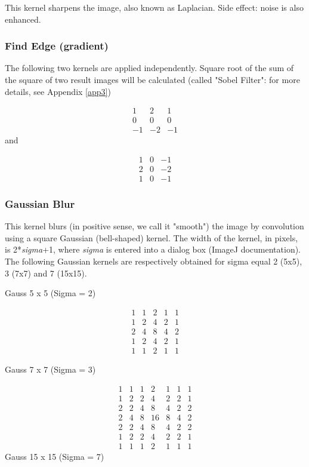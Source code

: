 This kernel sharpens the image, also known as Laplacian. Side effect:
noise is also enhanced. 


\subsubsection{Find Edge (gradient)}
\label{subsub:findedgekernel}
The following two kernels are applied independently. Square root of the sum
of the square of two result images will be calculated (called
"Sobel Filter": for more details,
see Appendix \ref{app3}) \ 

\[
 \begin{matrix}
  1 & 2 & 1 \\
  0 & 0 & 0 \\
  -1 & -2 & -1
 \end{matrix}
\]
and

\[
 \begin{matrix}
  1 & 0 & -1 \\
  2 & 0 & -2 \\
  1 & 0 & -1
 \end{matrix}
\]


\subsubsection{Gaussian Blur}
\label{subsubsec:gaussian}
This kernel blurs (in positive sense, we call it
"smooth") the image by convolution
using a square Gaussian (bell-shaped) kernel. The width of the kernel,
in pixels, is 2*\textit{sigma}+1, where \textit{sigma} is entered into
a dialog box (ImageJ documentation). The following Gaussian kernels are respectively obtained for sigma equal 2 (5x5), 3 (7x7) and 7 (15x15). 

Gauss 5 x 5 (Sigma = 2)
 
\[
 \begin{matrix}
  1 & 1 & 2 & 1 & 1\\
  1 & 2 & 4 & 2 & 1\\
  2 & 4 & 8 & 4 & 2\\
  1 & 2 & 4 & 2 & 1\\
  1 & 1 & 2 & 1 & 1
 \end{matrix}
\]

Gauss 7 x 7 (Sigma = 3)

\[
 \begin{matrix}
  1 & 1 & 1 & 2 & 1 & 1 & 1\\
  1 & 2 & 2 & 4 & 2 & 2 & 1\\
  2 & 2 & 4 & 8 & 4 & 2 & 2\\
  2 & 4 & 8 & 16 & 8 & 4 & 2\\
  2 & 2 & 4 & 8 & 4 & 2 & 2\\
  1 & 2 & 2 & 4 & 2 & 2 & 1\\
  1 & 1 & 1 & 2 & 1 & 1 & 1
 \end{matrix}
\]
Gauss 15 x 15 (Sigma = 7)

